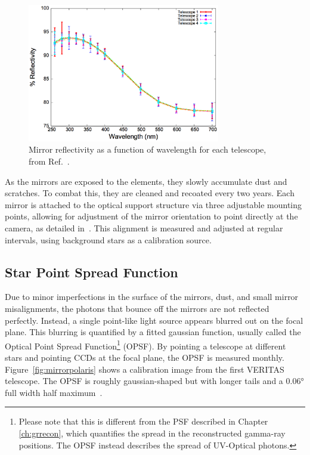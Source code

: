 \begin{figure}[ht]
  \centering
  \includegraphics[width=0.75\textwidth]{images/mirror_reflect}
  \caption[Mirror Reflectivity]{
    Mirror reflectivity as a function of wavelength for each telescope, from Ref.~\cite{mirrorfacets}. 
  }
  \label{fig:mirreflect}
\end{figure}

As the mirrors are exposed to the elements, they slowly accumulate dust and scratches.
To combat this, they are cleaned and recoated every two years.
Each mirror is attached to the optical support structure via three adjustable mounting points, allowing for adjustment of the mirror orientation to point directly at the camera, as detailed in~\cite{mirroralign}.
This alignment is measured and adjusted at regular intervals, using background stars as a calibration source.

\subsection{Star Point Spread Function}

Due to minor imperfections in the surface of the mirrors, dust, and small mirror misalignments, the photons that bounce off the mirrors are not reflected perfectly.
Instead, a single point-like light source appears blurred out on the focal plane.
This blurring is quantified by a fitted gaussian function, usually called the Optical Point Spread Function\footnote{Please note that this is different from the PSF described in Chapter \ref{ch:grrecon}, which quantifies the spread in the reconstructed gamma-ray positions.  The OPSF instead describes the spread of UV-Optical photons.} (OPSF).
By pointing a telescope at different stars and pointing CCDs at the focal plane, the OPSF is measured monthly.
Figure~\ref{fig:mirrorpolaris} shows a calibration image from the first VERITAS telescope.
The OPSF is roughly gaussian-shaped but with longer tails and a $ \ang{0.06} $ full width half maximum~\cite{Veritas_Detector}.

